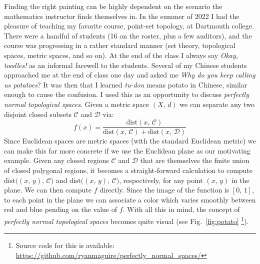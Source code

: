 \documentclass{article}
\begin{document}
    \par\hfill\par
    Finding the right painting can be highly dependent on the scenario the
    mathematics instructor finds themselves in. In the summer of 2022 I had the
    pleasure of teaching my favorite course, point-set topology, at Dartmouth
    college. There were a handful of students (16 on the roster, plus a few
    auditors), and the course was progressing in a rather standard manner
    (set theory, topological spaces, metric spaces, and so on). At the
    end of the class I always say \textit{Okay, toodles!} as an informal
    farewell to the students. Several of my Chinese students approached me at
    the end of class one day and asked me
    \textit{Why do you keep calling us potatoes}?
    It was then that I learned \textit{tu-dou} means potato in Chinese, similar
    enough to cause the confusion. I used this as an opportunity to discuss
    \textit{perfectly normal topological spaces}.
    Given a metric space $(X,\,d)$ we can separate any two disjoint closed
    subsets $\mathcal{C}$ and $\mathcal{D}$ via:
    \begin{equation}
        f(x)=
        \frac{\textrm{dist}(x,\,\mathcal{C})}
             {\textrm{dist}(x,\,\mathcal{C})+\textrm{dist}(x,\,\mathcal{D})}
    \end{equation}
    Since Euclidean spaces are metric spaces
    (with the standard Euclidean metric) we can make this far more concrete if
    we use the Euclidean plane as our motivating example. Given any closed
    regions $\mathcal{C}$ and $\mathcal{D}$ that are themselves the finite
    union of closed polygonal regions, it becomes a straight-forward
    calculation to compute
    $\textrm{dist}\big((x,\,y),\,\mathcal{C}\big)$ and
    $\textrm{dist}\big((x,\,y),\,\mathcal{C}\big)$, respectively, for any point
    $(x,\,y)$ in the plane. We can then compute $f$ directly. Since the image
    of the function is $[0,\,1]$, to each point in the plane we can associate
    a color which varies smoothly between red and blue pending on the value of
    $f$. With all this in mind, the concept of
    \textit{perfectly normal topological spaces} becomes quite visual
    (see Fig.~\ref{fig:potato}
    \footnote{%
        Source code for this is available:
        \url{https://github.com/ryanmaguire/perfectly_normal_spaces/}
    }).
\end{document}
